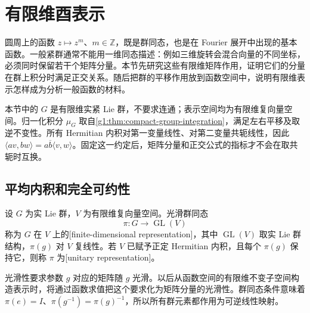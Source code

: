 
% 
% 

\section{有限维酉表示}
\label{g1:sec:2001}

圆周上的函数 \(z\mapsto z^m\)、\(m\in\mathbb Z\)，既是群同态，也是在 Fourier 展开中出现的基本函数。一般紧群通常不能用一维同态描述：例如三维旋转会混合向量的不同坐标，必须同时保留若干个矩阵分量。本节先研究这些有限维矩阵作用，证明它们的分量在群上积分时满足正交关系。随后把群的平移作用放到函数空间中，说明有限维表示怎样成为分析一般函数的材料。

\ProseParagraphBreak

本节中的 \(G\) 是有限维实紧 Lie 群，不要求连通；表示空间均为有限维复向量空间。归一化积分 \(\mu_G\) 取自\cref{g1:thm:compact-group-integration}，满足左右平移及取逆不变性。所有 Hermitian 内积对第一变量线性、对第二变量共轭线性，因此 \(\langle av,bw\rangle=a\overline b\langle v,w\rangle\)。固定这一约定后，矩阵分量和正交公式的指标才不会在取共轭时互换。

\subsection{平均内积和完全可约性}
\label{g1:subsec:2001:01}
\begin{definition}\label{g1:def:finite-dimensional-representation}
	设 \(G\) 为实 Lie 群，\(V\) 为有限维复向量空间。光滑群同态
	\[
		\pi:G\longrightarrow\operatorname{GL}(V)
	\]
	称为 \(G\) 在 \(V\) 上的[finite-dimensional representation]，其中 \(\operatorname{GL}(V)\) 取实 Lie 群结构，\(\pi(g)\) 对 \(V\) 复线性。若 \(V\) 已赋予正定 Hermitian 内积，且每个 \(\pi(g)\) 保持它，则称 \(\pi\) 为[unitary representation]。
\end{definition}

光滑性要求参数 \(g\) 对应的矩阵随 \(g\) 光滑。以后从函数空间的有限维不变子空间构造表示时，将通过函数求值把这个要求化为矩阵分量的光滑性。群同态条件意味着 \(\pi(e)=I\)、\(\pi(g^{-1})=\pi(g)^{-1}\)，所以所有群元素都作用为可逆线性映射。

